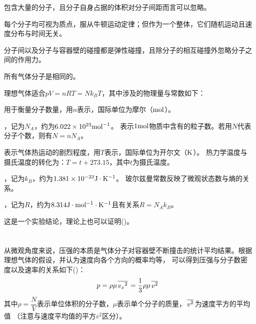         \begin{Itemize}
            \item 包含大量的分子，且分子自身占据的体积对分子间距而言可以忽略。
            \item 每个分子均可视为质点，服从牛顿运动定律；但作为一个整体，它们随机运动且速度分布与时间无关。
            \item 分子间以及分子与容器壁的碰撞都是弹性碰撞，且除分子的相互碰撞外忽略分子之间的作用力。
            \item 所有气体分子是相同的。
        \end{Itemize}
        \newpage
        理想气体适合\quad$pV=nRT=Nk_{B}T$，其中涉及的物理量与常数如下：
        \begin{Itemize}
            \item {}用于衡量分子数量，用$n$表示，国际单位为摩尔（$\rm{mol}$）。
            \item {}，记为$N_{A}$，约为$6.022\times 10^{23}\rm{mol}^{-1}$。
            表示$1\rm{mol}$物质中含有的粒子数。若用$N$代表分子个数，则有$N=nN_{A}$。
            \item {}表示气体热运动的剧烈程度，用$T$表示，国际单位为开尔文（$\rm{K}$）。
            热力学温度与摄氏温度的转化为：$T = t + 273.15$，其中$t$为摄氏温度。
            \item {}，记为$k_{B}$，约为$1.381\times 10^{-23}\rm{J}\cdot K^{-1}$。
            玻尔兹曼常数反映了微观状态数与熵的关系。
            \item {}，记为$R$，约为$8.314\rm{J}\cdot mol^{-1}\cdot K^{-1}$且有关系$R=N_{A}k_{B}$。
        \end{Itemize}

        这是一个实验结论，理论上也可以证明()。
    \section[分子动理论]{}
        \subsection[压强的微观解释]{}
            从微观角度来说，压强的本质是气体分子对容器壁不断撞击的统计平均结果。根据理想气体的假设，并认为速度向各个方向的概率均等，
            可以得到压强与分子数密度以及速率的关系如下()：
            \begin{equation}
                p = \rho \mu \upperline{v_{x}{}^{2}}=\frac{1}{3}\rho \mu \upperline{v^{2}}
                \nonumber
            \end{equation}
            其中$\rho = \dfrac{N}{V}$表示单位体积的分子数，$\mu$表示单个分子的质量，$\upperline{v^{2}}$为速度平方的平均值
            （注意与速度平均值的平方$\overline{v}{}^2$区分）。

